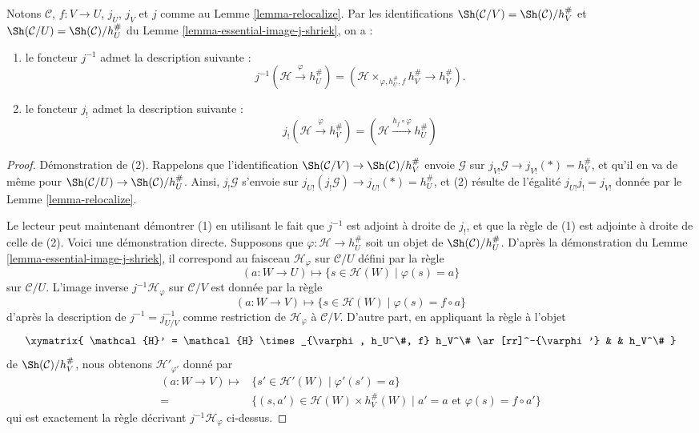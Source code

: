 \begin{lemma}
\label{lemma-relocalize-explicit}
Notons $\mathcal{C}$, $f : V \to U$, $j_U$, $j_V$ et $j$ comme au
Lemme \ref{lemma-relocalize}. Par les identifications
$\Sh(\mathcal{C}/V) = \Sh(\mathcal{C})/h_V^\#$ et
$\Sh(\mathcal{C}/U) = \Sh(\mathcal{C})/h_U^\#$ du
Lemme \ref{lemma-essential-image-j-shriek}, on a :
\begin{enumerate}
\item le foncteur $j^{-1}$ admet la description suivante :
$$
j^{-1}(\mathcal{H} \xrightarrow{\varphi} h_U^\#)
=
(\mathcal{H} \times_{\varphi, h_U^\#, f} h_V^\# \to h_V^\#).
$$
\item le foncteur $j_!$ admet la description suivante :
$$
j_!(\mathcal{H} \xrightarrow{\varphi} h_V^\#) =
(\mathcal{H} \xrightarrow{h_f \circ \varphi} h_U^\#)
$$
\end{enumerate}
\end{lemma}

\begin{proof}
Démonstration de (2). Rappelons que l’identification
$\Sh(\mathcal{C}/V) \to \Sh(\mathcal{C})/h_V^\#$
envoie $\mathcal{G}$ sur
$j_{V!}\mathcal{G} \to j_{V!}(*) = h_V^\#$,
et qu’il en va de même pour
$\Sh(\mathcal{C}/U) \to \Sh(\mathcal{C})/h_U^\#$.
Ainsi, $j_!\mathcal{G}$ s’envoie sur
$j_{U!}(j_!\mathcal{G}) \to j_{U!}(*) = h_U^\#$,
et (2) résulte de l’égalité $j_{U!}j_! = j_{V!}$ donnée par le
Lemme \ref{lemma-relocalize}.

\medskip\noindent
Le lecteur peut maintenant démontrer (1) en utilisant le fait que $j^{-1}$
est adjoint à droite de $j_!$, et que la règle de (1) est adjointe à droite
de celle de (2). Voici une démonstration directe.
Supposons que $\varphi : \mathcal{H} \to h_U^\#$ soit un objet de
$\Sh(\mathcal{C})/h_U^\#$. D’après la démonstration du
Lemme \ref{lemma-essential-image-j-shriek}, il correspond au faisceau
$\mathcal{H}_\varphi$ sur $\mathcal{C}/U$ défini par la règle
$$
(a : W \to U)
\longmapsto
\{ s \in \mathcal{H}(W) \mid \varphi(s) = a\}
$$
sur $\mathcal{C}/U$. L’image inverse $j^{-1}\mathcal{H}_\varphi$ sur
$\mathcal{C}/V$ est donnée par la règle
$$
(a : W \to V)
\longmapsto
\{ s \in \mathcal{H}(W) \mid \varphi(s) = f \circ a\}
$$
d’après la description de $j^{-1} = j_{U/V}^{-1}$ comme restriction de
$\mathcal{H}_\varphi$ à $\mathcal{C}/V$.
D’autre part, en appliquant la règle à l’objet
$$
\xymatrix{
\mathcal{H}' = \mathcal{H} \times_{\varphi, h_U^\#, f} h_V^\#
\ar[rr]^-{\varphi'} & & h_V^\#
}
$$
de $\Sh(\mathcal{C})/h_V^\#$, nous obtenons
$\mathcal{H}'_{\varphi'}$ donné par
\begin{align*}
(a : W \to V)
\longmapsto
&  \{ s' \in \mathcal{H}'(W) \mid \varphi'(s') = a\} \\
= &
\{ (s, a') \in \mathcal{H}(W) \times h_V^\#(W) \mid
a' = a \text{ et } \varphi(s) = f \circ a'\}
\end{align*}
qui est exactement la règle décrivant $j^{-1}\mathcal{H}_\varphi$ ci-dessus.
\end{proof}

